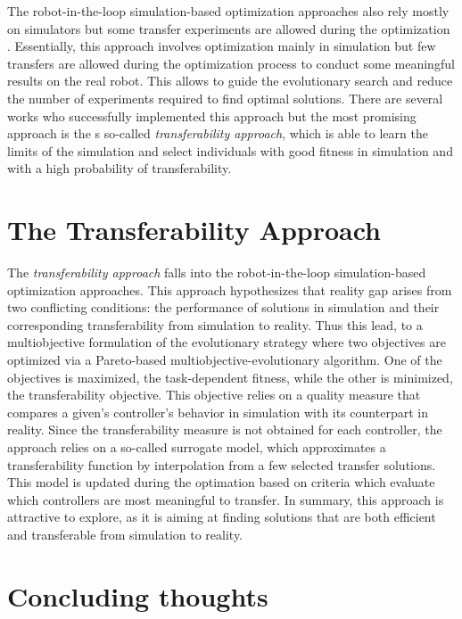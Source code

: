 The robot-in-the-loop simulation-based optimization approaches also rely mostly on simulators but some transfer experiments are allowed during the optimization \cite{inproceedings}. Essentially, this approach involves optimization mainly in simulation but few transfers are allowed during the optimization process to conduct some meaningful results on the real robot. This allows to guide the evolutionary search and reduce the number of experiments required to find optimal solutions. There are several works who successfully implemented this approach \cite{bongard2006resilient} \cite{koos2009automatic} but the most promising approach is the s so-called \emph{transferability approach}, which is able to learn the limits of the simulation and select individuals with good fitness in simulation and with a high probability of transferability.

\section{The Transferability Approach}

The \emph{transferability approach} falls into the robot-in-the-loop simulation-based optimization approaches. This approach hypothesizes that reality gap arises from two conflicting conditions: the performance of solutions in simulation and their corresponding transferability from simulation to reality. Thus this lead, to a multiobjective formulation of the evolutionary strategy where two objectives are optimized via a Pareto-based multiobjective-evolutionary algorithm. One of the objectives is maximized, the task-dependent fitness, while the other is minimized, the transferability objective. This objective relies on a quality measure that compares a given's controller's behavior in simulation with its counterpart in reality.  Since the transferability measure is not obtained for each controller, the approach relies on a so-called surrogate model, which approximates a transferability function by interpolation from a few selected transfer solutions. This model is updated during the optimation based on criteria which evaluate which controllers are most meaningful to transfer. In summary, this approach is attractive to explore, as it is aiming at finding solutions that are both efficient and transferable from simulation to reality.

\section{Concluding thoughts}

